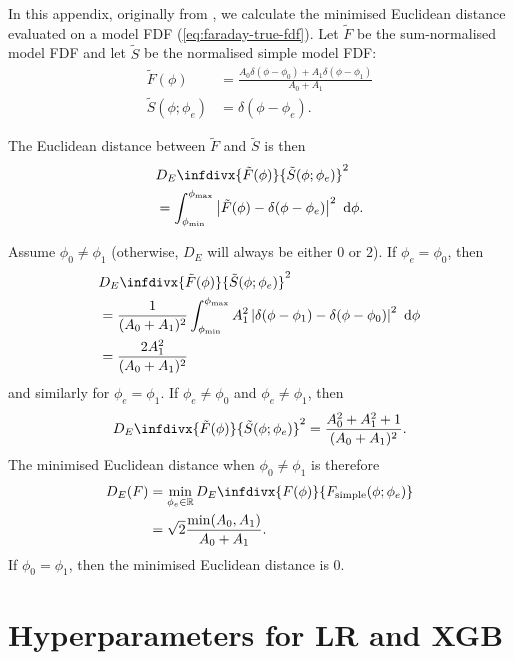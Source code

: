   In this appendix, originally from \citet{alger2021interpretable}, we calculate the minimised Euclidean distance evaluated on a model FDF (\autoref{eq:faraday-true-fdf}). Let $\tilde F$ be the sum-normalised model FDF and let $\tilde S$ be the normalised simple model FDF:
  \begin{align}
    \tilde F(\phi) &= \frac{A_0 \delta(\phi - \phi_0) + A_1 \delta(\phi - \phi_1)}{A_0 + A_1}\\
    \tilde S(\phi; \phi_e) &= \delta(\phi - \phi_e).
  \end{align}

  The Euclidean distance between $\tilde F$ and $\tilde S$ is then
  \begin{align}
    &D_E\infdivx{\tilde F(\phi)}{\tilde S(\phi; \phi_e)}^2\\
    &= \int_{\phi_{\min}}^{\phi_{\max}} \left|\tilde F(\phi) - \delta(\phi - \phi_e) \right|^2\ \mathrm{d}\phi.
  \end{align}

  Assume $\phi_0 \neq \phi_1$ (otherwise, $D_E$ will always be either $0$ or $2$). If $\phi_e = \phi_0$, then
  \begin{align}
    &D_E\infdivx{\tilde F(\phi)}{\tilde S(\phi; \phi_e)}^2\\
      &= \frac{1}{(A_0 + A_1)^2} \int_{\phi_{\min}}^{\phi_{\max}} A_1^2 \left|\delta(\phi - \phi_1) - \delta(\phi - \phi_0) \right|^2\ \mathrm{d}\phi\\
      &= \frac{2 A_1^2}{(A_0 + A_1)^2}
  \end{align}
  and similarly for $\phi_e = \phi_1$. If $\phi_e \neq \phi_0$ and $\phi_e \neq \phi_1$, then
  \begin{equation}
    D_E\infdivx{\tilde F(\phi)}{\tilde S(\phi; \phi_e)}^2 = \frac{A_0^2 + A_1^2 + 1}{(A_0 + A_1)^2}.
  \end{equation}
  The minimised Euclidean distance when $\phi_0 \neq \phi_1$ is therefore
  \begin{align}
      D_E(F) &= \min_{\phi_e \in \mathbb{R}} D_E\infdivx{F(\phi)}{F_{\mathrm{simple}}(\phi; \phi_e)}\\
          &= \sqrt{2} \frac{\min(A_0, A_1)}{A_0 + A_1}.
  \end{align}
  If $\phi_0 = \phi_1$, then the minimised Euclidean distance is 0.

\section{Hyperparameters for LR and XGB}
\label{sec:faraday-hyperparameters}

